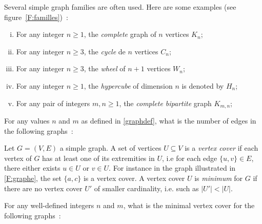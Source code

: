\documentclass[12pt,addpoints]{exam}
\begin{document}
\begin{questions}
\question
Several simple graph families are often used. Here are some examples (see figure~\ref{F:familles})~:
\label{graphdef}\begin{enumerate}[(i)]
  \item For any integer $n \geq 1$, the \emph{complete} graph of $n$ vertices $K_n$;
  \item For any integer $n \geq 3$, the \emph{cycle} de $n$ vertices $C_n$;
  \item For any integer $n \geq 3$, the \emph{wheel} of $n + 1$ vertices $W_n$;
  \item For any integer $n \geq 1$, the \emph{hypercube} of dimension $n$ is denoted by $H_n$;
  \item For any pair of integers $m,n \geq 1$, the \emph{complete bipartite} graph $K_{m,n}$;
\end{enumerate}
For any values $n$ and $m$ as defined in \ref{graphdef}, what is the number of edges in the following graphs~:

\question
Let $G = (V,E)$ a simple graph. A set of vertices $U \subseteq V$ is a \emph{vertex cover} if each vertex of $G$ has at least one of its extremities in $U$, i.e for each edge $\{u,v\} \in E$, there either exists $u \in U$ or $v \in U$.
For instance in the graph illustrated in \ref{F:graphe}, the set $\{a,c\}$ is a vertex cover. A vertex cover $U$ is \emph{minimum} for $G$ if there are no vertex cover $U'$ of smaller cardinality, i.e. such as $|U'| < |U|$.

For any well-defined integers $n$ and $m$, what is the minimal vertex cover for the following graphs~:
\begin{parts}

\end{parts}
\end{questions}
\end{document}
